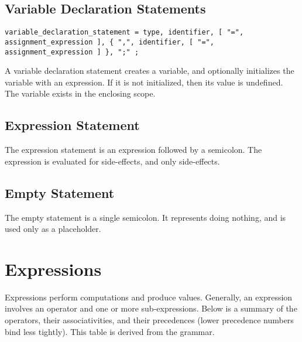 \documentclass[letterpaper,12pt]{book}
\begin{document}
\section{Variable Declaration Statements}

\begin{lstlisting}[breaklines=true]
variable_declaration_statement = type, identifier, [ "=", assignment_expression ], { ",", identifier, [ "=", assignment_expression ] }, ";" ;
\end{lstlisting}

A variable declaration statement creates a variable, and optionally initializes the variable with an expression. If it is not initialized, then its value is undefined. The variable exists in the enclosing scope.

\section{Expression Statement}

The expression statement is an expression followed by a semicolon. The expression is evaluated for side-effects, and only side-effects.

\section{Empty Statement}

The empty statement is a single semicolon. It represents doing nothing, and is used only as a placeholder.

\chapter{Expressions}

Expressions perform computations and produce values. Generally, an expression involves an operator and one or more sub-expressions. Below is a summary of the operators, their associativities, and their precedences (lower precedence numbers bind less tightly). This table is derived from the grammar.
\end{document}
